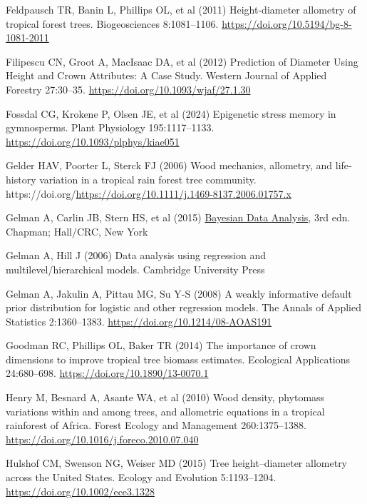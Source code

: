 \documentclass[
  12pt,
  letterpaper,
  DIV=11,
  numbers=noendperiod]{scrartcl}
\newlength{\cslhangindent}
\newenvironment{CSLReferences}[2] %
 {\begin{list}{}{%
  \setlength{\itemindent}{0pt}
  \setlength{\leftmargin}{0pt}
  \setlength{\parsep}{0pt}
  \ifodd #1
   \setlength{\leftmargin}{\cslhangindent}
   \setlength{\itemindent}{-1\cslhangindent}
  \fi
  \setlength{\itemsep}{#2\baselineskip}}}
 {\end{list}}
\begin{document}
\begin{CSLReferences}{1}{1}
Feldpausch TR, Banin L, Phillips OL, et al (2011) Height-diameter
allometry of tropical forest trees. Biogeosciences 8:1081--1106.
\url{https://doi.org/10.5194/bg-8-1081-2011}

Filipescu CN, Groot A, MacIsaac DA, et al (2012) Prediction of
{Diameter} {Using} {Height} and {Crown} {Attributes}: {A} {Case}
{Study}. Western Journal of Applied Forestry 27:30--35.
\url{https://doi.org/10.1093/wjaf/27.1.30}

Fossdal CG, Krokene P, Olsen JE, et al (2024) Epigenetic stress memory
in gymnosperms. Plant Physiology 195:1117--1133.
\url{https://doi.org/10.1093/plphys/kiae051}

Gelder HAV, Poorter L, Sterck FJ (2006) Wood mechanics, allometry, and
life‐history variation in a tropical rain forest tree community.
https://doi.org/\url{https://doi.org/10.1111/j.1469-8137.2006.01757.x}

Gelman A, Carlin JB, Stern HS, et al (2015)
\href{https://doi.org/10.1201/b16018}{Bayesian {Data} {Analysis}}, 3rd
edn. Chapman; Hall/CRC, New York

Gelman A, Hill J (2006) Data analysis using regression and
multilevel/hierarchical models. Cambridge University Press

Gelman A, Jakulin A, Pittau MG, Su Y-S (2008) A weakly informative
default prior distribution for logistic and other regression models. The
Annals of Applied Statistics 2:1360--1383.
\url{https://doi.org/10.1214/08-AOAS191}

Goodman RC, Phillips OL, Baker TR (2014) The importance of crown
dimensions to improve tropical tree biomass estimates. Ecological
Applications 24:680--698. \url{https://doi.org/10.1890/13-0070.1}

Henry M, Besnard A, Asante WA, et al (2010) Wood density, phytomass
variations within and among trees, and allometric equations in a
tropical rainforest of {Africa}. Forest Ecology and Management
260:1375--1388. \url{https://doi.org/10.1016/j.foreco.2010.07.040}

Hulshof CM, Swenson NG, Weiser MD (2015) Tree height--diameter allometry
across the {United} {States}. Ecology and Evolution 5:1193--1204.
\url{https://doi.org/10.1002/ece3.1328}


\end{CSLReferences}
\end{document}

